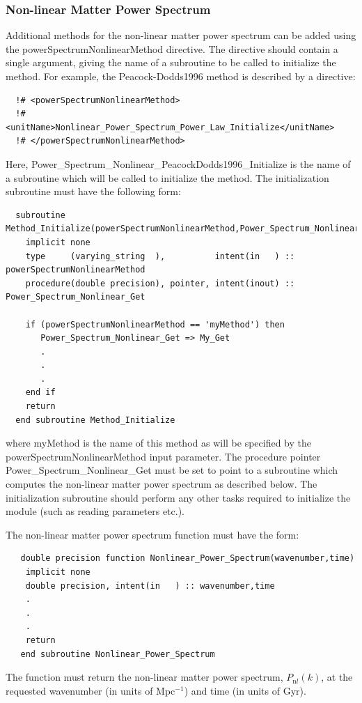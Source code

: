\subsubsection{Non-linear Matter Power Spectrum}

Additional methods for the non-linear matter power spectrum can be added using the {\normalfont \ttfamily powerSpectrumNonlinearMethod} directive. The directive should contain a single argument, giving the name of a subroutine to be called to initialize the method. For example, the {\normalfont \ttfamily Peacock-Dodds1996} method is described by a directive:
\begin{verbatim}
  !# <powerSpectrumNonlinearMethod>
  !#  <unitName>Nonlinear_Power_Spectrum_Power_Law_Initialize</unitName>
  !# </powerSpectrumNonlinearMethod>
\end{verbatim}
Here, {\normalfont \ttfamily Power\_Spectrum\_Nonlinear\_PeacockDodds1996\_Initialize} is the name of a subroutine which will be called to initialize the method. The initialization subroutine must have the following form:
\begin{verbatim}
  subroutine Method_Initialize(powerSpectrumNonlinearMethod,Power_Spectrum_Nonlinear_Get)
    implicit none
    type     (varying_string  ),          intent(in   ) :: powerSpectrumNonlinearMethod
    procedure(double precision), pointer, intent(inout) :: Power_Spectrum_Nonlinear_Get
    
    if (powerSpectrumNonlinearMethod == 'myMethod') then
       Power_Spectrum_Nonlinear_Get => My_Get
       .
       .
       .
    end if
    return
  end subroutine Method_Initialize
\end{verbatim}
where {\normalfont \ttfamily myMethod} is the name of this method as will be specified by the {\normalfont \ttfamily powerSpectrumNonlinearMethod} input parameter. The procedure pointer {\normalfont \ttfamily Power\_Spectrum\_Nonlinear\_Get} must be set to point to a subroutine which computes the non-linear matter power spectrum as described below. The initialization subroutine should perform any other tasks required to initialize the module (such as reading parameters etc.).

The non-linear matter power spectrum function must have the form:
\begin{verbatim}
   double precision function Nonlinear_Power_Spectrum(wavenumber,time)
    implicit none
    double precision, intent(in   ) :: wavenumber,time
    .
    .
    .
    return
   end subroutine Nonlinear_Power_Spectrum
\end{verbatim}
The function must return the non-linear matter power spectrum, $P_{\mathrm nl}(k)$, at the requested {\normalfont \ttfamily wavenumber} (in units of Mpc$^{-1}$) and {\normalfont \ttfamily time} (in units of Gyr).

